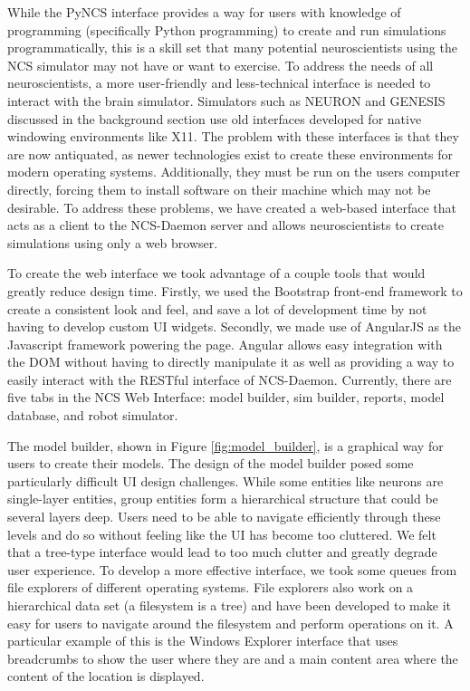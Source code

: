 While the PyNCS interface provides a way for users with knowledge of programming (specifically Python programming) to create and run simulations programmatically, this is a skill set that many potential neuroscientists using the NCS simulator may not have or want to exercise. To address the needs of all neuroscientists, a more user-friendly and less-technical interface is needed to interact with the brain simulator. Simulators such as NEURON and GENESIS discussed in the background section use old interfaces developed for native windowing environments like X11. The problem with these interfaces is that they are now antiquated, as newer technologies exist to create these environments for modern operating systems. Additionally, they must be run on the users computer directly, forcing them to install software on their machine which may not be desirable. To address these problems, we have created a web-based interface that acts as a client to the NCS-Daemon server and allows neuroscientists to create simulations using only a web browser.

To create the web interface we took advantage of a couple tools that would greatly reduce design time. Firstly, we used the Bootstrap front-end framework to create a consistent look and feel, and save a lot of development time by not having to develop custom UI widgets. Secondly, we made use of AngularJS as the Javascript framework powering the page. Angular allows easy integration with the DOM without having to directly manipulate it as well as providing a way to easily interact with the RESTful interface of NCS-Daemon. Currently, there are five tabs in the NCS Web Interface: model builder, sim builder, reports, model database, and robot simulator. 

The model builder, shown in Figure \ref{fig:model_builder}, is a graphical way for users to create their models. The design of the model builder posed some particularly difficult UI design challenges. While some entities like neurons are single-layer entities, group entities form a hierarchical structure that could be several layers deep. Users need to be able to navigate efficiently through these levels and do so without feeling like the UI has become too cluttered. We felt that a tree-type interface would lead to too much clutter and greatly degrade user experience. To develop a more effective interface, we took some queues from file explorers of different operating systems. File explorers also work on a hierarchical data set (a filesystem is a tree) and have been developed to make it easy for users to navigate around the filesystem and perform operations on it. A particular example of this is the Windows Explorer interface that uses breadcrumbs to show the user where they are and a main content area where the content of the location is displayed. 

